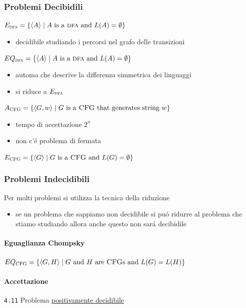 \documentclass[
                        12pt, %
                        a4paper, %
                        oneside, %
                        headinclude,footinclude, %
                        BCOR5mm, %
                  ]{scrartcl}
\begin{document}
\subsubsection{Problemi Decibidili}
\label{sec:orgc5d1b9c}
\(E_{\textsc{dfa}} = \{\langle A \rangle \mid A\mbox{ is a \textsc{dfa} and } L(A)=\emptyset \}\)
\begin{itemize}
\item decidibile studiando i percorsi nel grafo delle transizioni
\end{itemize}
\(EQ_{\textsc{dfa}} = \{\langle A \rangle\mid A\mbox{ is a \textsc{dfa} and } L(A)=\emptyset\}\)
\begin{itemize}
\item automa che descrive la differenza simmetrica dei linguaggi
\item si riduce a \(E_{\textsc{dfa}}\)
\end{itemize}
\(A_{\textsc{CFG}}=\{\langle G,w \rangle \mid G\mbox{ is a \textsc{CFG} that generates string }w\}\)
\begin{itemize}
\item tempo di accettazione \(2^n\)
\item non c'é problema di fermata
\end{itemize}
\(E_{\textsc{CFG}}=\{\langle G \rangle \mid G\mbox{ is a \textsc{CFG} and }L(G) = \emptyset\}\)

\subsubsection{Problemi Indecidibili}
\label{sec:orgc5f935b}
Per molti problemi si utilizza la tecnica della riduzione
\begin{itemize}
\item se un problema che sappiamo non decidibile si puó ridurre al problema che stiamo studiando allora anche questo non sará decibidile
\end{itemize}
\paragraph{Eguaglianza Chompsky}
\label{sec:org3570a29}
\(EQ_{\textsc{CFG}}=\{\langle G,H \rangle \mid G\mbox{ and }H\mbox{ are \textsc{CFG}s and }L(G) = L(H)\}\)
\paragraph{Accettazione}
\label{sec:org0f79967}
\texttt{4.11}
Problema \uline{positivamente decidibile}
\end{document}
